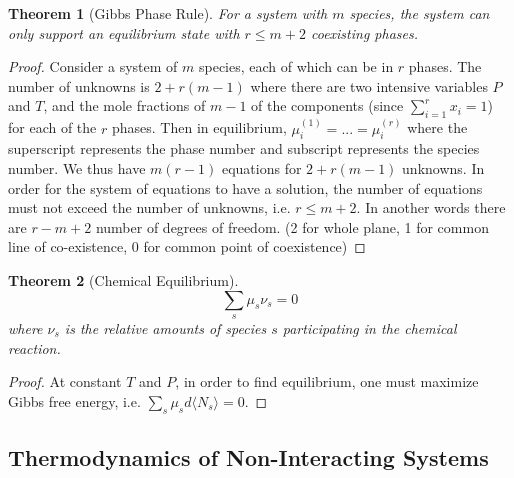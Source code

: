 \documentclass[a4paper]{article}
\theoremstyle{new}
\newtheorem{thm}{Theorem}[section]
\begin{document}
\begin{thm}[Gibbs Phase Rule]
For a system with $m$ species, the system can only support an equilibrium state with $r\leq m+2$ coexisting phases.
\end{thm}
\begin{proof}
Consider a system of $m$ species, each of which can be in $r$ phases. The number of unknowns is $2+r(m-1)$ where there are two intensive variables $P$ and $T$, and the mole fractions of $m-1$ of the components (since $\sum_{i=1}^rx_i=1$) for each of the $r$ phases. Then in equilibrium, $\mu_i^{(1)}=...=\mu_i^{(r)}$ where the superscript represents the phase number and subscript represents the species number. We thus have $m(r-1)$ equations for $2+r(m-1)$ unknowns. In order for the system of equations to have a solution, the number of equations must not exceed the number of unknowns, i.e. $r\leq m+2$. In another words there are $r-m+2$ number of degrees of freedom. (2 for whole plane, 1 for common line of co-existence, 0 for common point of coexistence)
\end{proof}
\begin{thm}[Chemical Equilibrium]
$$\sum_s\mu_s\nu_s=0$$
where $\nu_s$ is the relative amounts of species $s$ participating in the chemical reaction.
\end{thm}
\begin{proof}
At constant $T$ and $P$, in order to find equilibrium, one must maximize Gibbs free energy, i.e. $\sum_s\mu_sd\langle N_s\rangle=0$.
\end{proof}
\newpage
\subsection{Thermodynamics of Non-Interacting Systems}
\end{document}
